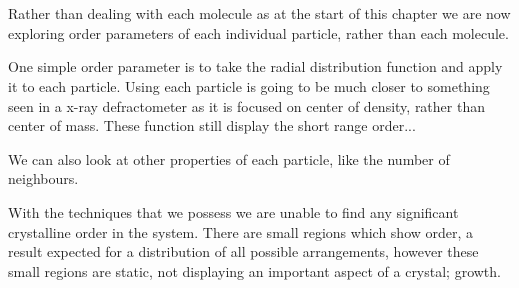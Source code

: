 \section{}


Rather than dealing with each molecule as at the start of this chapter we are now exploring order parameters of each individual particle, rather than each molecule.

One simple order parameter is to take the radial distribution function and apply it to each particle. Using each particle is going to be much closer to something seen in a x-ray defractometer as it is focused on center of density, rather than center of mass. These function still display the short range order...


We can also look at other properties of each particle, like the number of neighbours.

With the techniques that we possess we are unable to find any significant crystalline order in the system. There are small regions which show order, a result expected for a distribution of all possible arrangements, however these small regions are static, not displaying an important aspect of a crystal; growth.



